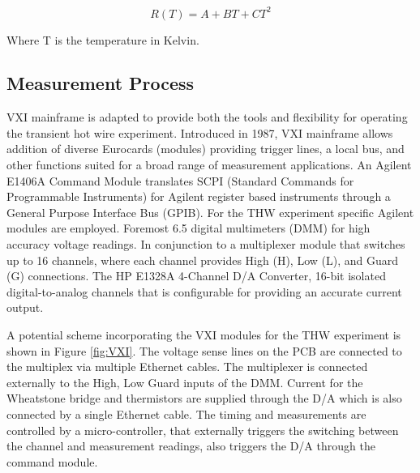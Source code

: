 \documentclass[12pt,MEng]{UoAThesis}
\begin{document}
\begin{equation} \label{eq:cal}
R(T) = A + BT + CT^2
\end{equation}

\noindent Where T is the temperature in Kelvin.

\subsection{Measurement Process}
VXI mainframe is adapted to provide both the tools and flexibility for operating the transient hot wire experiment. Introduced in 1987, VXI mainframe allows addition of diverse Eurocards (modules) providing trigger lines, a local bus, and other functions suited for a broad range of measurement applications. An Agilent E1406A Command Module translates SCPI (Standard Commands for Programmable
Instruments) for Agilent register based instruments through a General Purpose Interface Bus (GPIB). For the THW experiment specific Agilent modules are employed. Foremost 6.5 digital multimeters (DMM) for high accuracy voltage readings. In conjunction to a multiplexer module that switches up to 16 channels, where each channel provides High (H), Low (L), and Guard (G) connections. The HP E1328A 4-Channel D/A Converter, 16-bit isolated digital-to-analog channels that is configurable for providing an accurate current output. 

A potential scheme incorporating the VXI modules for the THW experiment is shown in Figure \ref{fig:VXI}. The voltage sense lines on the PCB are connected to the multiplex via multiple Ethernet cables. The multiplexer is connected externally to the High, Low Guard inputs of the DMM. Current for the Wheatstone bridge and thermistors are supplied through the D/A which is also connected by a single Ethernet cable. The timing and measurements are controlled by a micro-controller, that externally triggers the switching between the channel and measurement readings, also triggers the D/A through the command module. 
\end{document}

